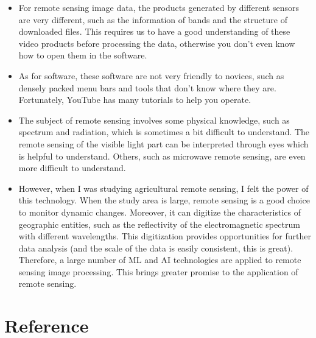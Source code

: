\documentclass[
  letterpaper,
  DIV=11,
  numbers=noendperiod]{scrreprt}
\begin{document}
\begin{itemize}
\item
  For remote sensing image data, the products generated by different
  sensors are very different, such as the information of bands and the
  structure of downloaded files. This requires us to have a good
  understanding of these video products before processing the data,
  otherwise you don't even know how to open them in the software.
\item
  As for software, these software are not very friendly to novices, such
  as densely packed menu bars and tools that don't know where they are.
  Fortunately, YouTube has many tutorials to help you operate.
\item
  The subject of remote sensing involves some physical knowledge, such
  as spectrum and radiation, which is sometimes a bit difficult to
  understand. The remote sensing of the visible light part can be
  interpreted through eyes which is helpful to understand. Others, such
  as microwave remote sensing, are even more difficult to understand.
\item
  However, when I was studying agricultural remote sensing, I felt the
  power of this technology. When the study area is large, remote sensing
  is a good choice to monitor dynamic changes. Moreover, it can digitize
  the characteristics of geographic entities, such as the reflectivity
  of the electromagnetic spectrum with different wavelengths. This
  digitization provides opportunities for further data analysis (and the
  scale of the data is easily consistent, this is great). Therefore, a
  large number of ML and AI technologies are applied to remote sensing
  image processing. This brings greater promise to the application of
  remote sensing.
\end{itemize}

\hypertarget{reference}{%
\section{Reference}\label{reference}}
\end{document}
